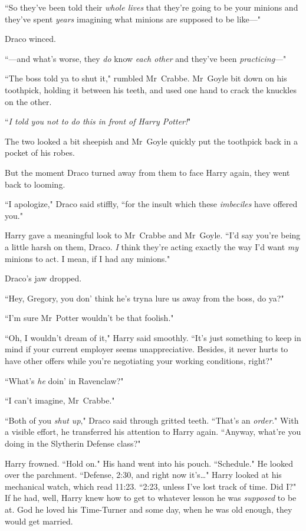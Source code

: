 ``So they've been told their \emph{whole lives} that they're going to be your minions and they've spent \emph{years} imagining what minions are supposed to be like—"

Draco winced.

``—and what's worse, they \emph{do} know \emph{each other} and they've been \emph{practicing}—"

``The boss told ya to shut it," rumbled Mr~Crabbe. Mr~Goyle bit down on his toothpick, holding it between his teeth, and used one hand to crack the knuckles on the other.

``\emph{I told you not to do this in front of Harry Potter!}"

The two looked a bit sheepish and Mr~Goyle quickly put the toothpick back in a pocket of his robes.

But the moment Draco turned away from them to face Harry again, they went back to looming.

``I apologize," Draco said stiffly, ``for the insult which these \emph{imbeciles} have offered you."

Harry gave a meaningful look to Mr~Crabbe and Mr~Goyle. ``I'd say you're being a little harsh on them, Draco. \emph{I} think they're acting exactly the way I'd want \emph{my} minions to act. I mean, if I had any minions."

Draco's jaw dropped.

``Hey, Gregory, you don' think he's tryna lure us away from the boss, do ya?"

``I'm sure Mr~Potter wouldn't be that foolish."

``Oh, I wouldn't dream of it," Harry said smoothly. ``It's just something to keep in mind if your current employer seems unappreciative. Besides, it never hurts to have other offers while you're negotiating your working conditions, right?"

``What's \emph{he} doin' in Ravenclaw?"

``I can't imagine, Mr~Crabbe."

``Both of you \emph{shut up}," Draco said through gritted teeth. ``That's an \emph{order}." With a visible effort, he transferred his attention to Harry again. ``Anyway, what're you doing in the Slytherin Defense class?"

Harry frowned. ``Hold on." His hand went into his pouch. ``Schedule." He looked over the parchment. ``Defense, 2:30\pm, and right now it's{\ldots}" Harry looked at his mechanical watch, which read 11:23. ``2:23, unless I've lost track of time. Did I?" If he had, well, Harry knew how to get to whatever lesson he was \emph{supposed} to be at. God he loved his Time-Turner and some day, when he was old enough, they would get married.

